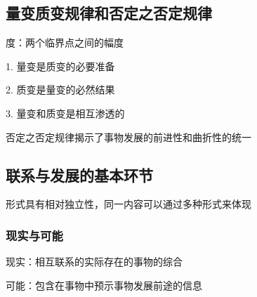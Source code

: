 \subsection{量变质变规律和否定之否定规律}%
\label{sub:量变质变规律和否定之否定规律}
\begin{notation}
    度：两个临界点之间的幅度
\end{notation}
1. 量变是质变的必要准备

2. 质变是量变的必然结果

3. 量变和质变是相互渗透的
\begin{notation}
    否定之否定规律揭示了事物发展的前进性和曲折性的统一
\end{notation}
\subsection{联系与发展的基本环节}%
\label{sub:联系与发展的基本环节}
形式具有相对独立性，同一内容可以通过多种形式来体现
\subsubsection{现实与可能}%
\label{subsub:现实与可能}
现实：相互联系的实际存在的事物的综合

可能：包含在事物中预示事物发展前途的信息

